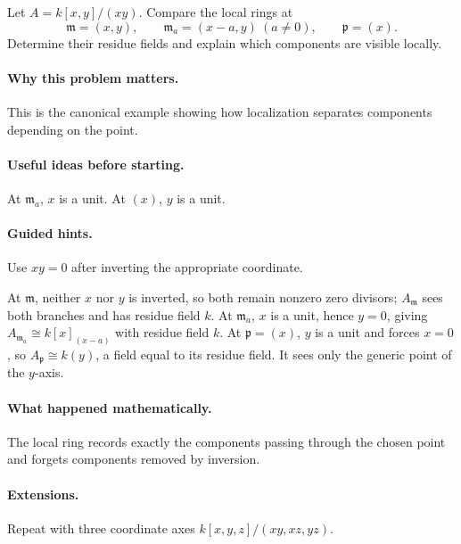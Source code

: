 \begin{problem}
Let $A=k[x,y]/(xy)$.  Compare the local rings at
\[
\mathfrak m=(x,y),\qquad
\mathfrak m_a=(x-a,y)\ (a\neq0),\qquad
\mathfrak p=(x).
\]
Determine their residue fields and explain which components are visible locally.
\end{problem}

\paragraph{Why this problem matters.}
This is the canonical example showing how localization separates components depending on the point.

\paragraph{Useful ideas before starting.}
At $\mathfrak m_a$, $x$ is a unit.  At $(x)$, $y$ is a unit.

\paragraph{Guided hints.}
Use $xy=0$ after inverting the appropriate coordinate.

\begin{solution}
At $\mathfrak m$, neither $x$ nor $y$ is inverted, so both remain nonzero zero divisors; $A_{\mathfrak m}$ sees both branches and has residue field $k$.  At $\mathfrak m_a$, $x$ is a unit, hence $y=0$, giving $A_{\mathfrak m_a}\cong k[x]_{(x-a)}$ with residue field $k$.  At $\mathfrak p=(x)$, $y$ is a unit and forces $x=0$, so $A_{\mathfrak p}\cong k(y)$, a field equal to its residue field.  It sees only the generic point of the $y$-axis.
\end{solution}

\paragraph{What happened mathematically.}
The local ring records exactly the components passing through the chosen point and forgets components removed by inversion.

\paragraph{Extensions.}
Repeat with three coordinate axes $k[x,y,z]/(xy,xz,yz)$.
